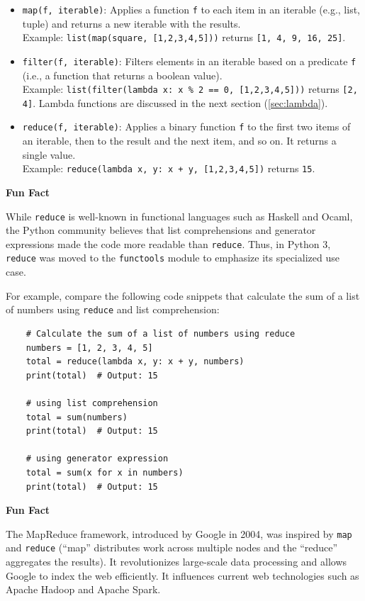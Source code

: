 \documentclass[oneside,11pt,dvipsnames]{book}
\newenvironment{historybox}[1][]{
  \small
  \begin{myhistorybox}
    {\small \textbf{#1}}
  }{
  \end{myhistorybox}
}
\newcommand{\code}[1]{\texttt{#1}}
\begin{document}
\begin{itemize}
    \item \code{map(f, iterable)}: Applies a function \code{f} to each item in an iterable (e.g., list, tuple) and returns a new iterable with the results.\\
    Example: \code{list(map(square, [1,2,3,4,5]))} returns \code{[1, 4, 9, 16, 25]}.
    \item \code{filter(f, iterable)}: Filters elements in an iterable based on a predicate \code{f} (i.e., a function that returns a boolean value).\\
    Example: \code{list(filter(lambda x: x \% 2 == 0, [1,2,3,4,5]))} returns \code{[2, 4]}. Lambda functions are discussed in the next section (\autoref{sec:lambda}).
    \item \code{reduce(f, iterable)}: Applies a binary function \code{f} to the first two items of an iterable, then to the result and the next item, and so on. It returns a single value.\\
    Example: \code{reduce(lambda x, y: x + y, [1,2,3,4,5])} returns \code{15}. 
\end{itemize}

\begin{historybox}[Fun Fact] 
    While \code{reduce} is well-known in functional languages such as Haskell and Ocaml, the Python community believes that list comprehensions and generator expressions made the code more readable than \code{reduce}. Thus, in Python 3, \code{reduce} was moved to the \code{functools} module to emphasize its specialized use case.

    For example, compare the following code snippets that calculate the sum of a list of numbers using \code{reduce} and list comprehension:
    \begin{lstlisting}
    # Calculate the sum of a list of numbers using reduce
    numbers = [1, 2, 3, 4, 5]
    total = reduce(lambda x, y: x + y, numbers)
    print(total)  # Output: 15
    
    # using list comprehension
    total = sum(numbers)
    print(total)  # Output: 15
    
    # using generator expression
    total = sum(x for x in numbers)
    print(total)  # Output: 15
    \end{lstlisting}    
\end{historybox}


\begin{historybox}[Fun Fact]
The MapReduce framework, introduced by Google in 2004, was inspired by \code{map} and \code{reduce} (``map'' distributes work across multiple nodes and the ``reduce'' aggregates the results).  It revolutionizes large-scale data processing and allows Google to index the web efficiently. It influences current web technologies such as Apache Hadoop and Apache Spark.
\end{historybox}
\end{document}
